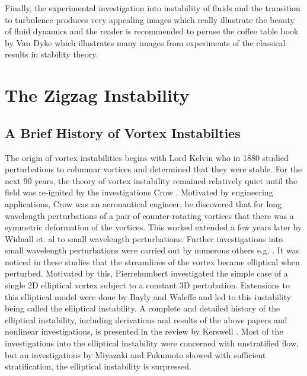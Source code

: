 Finally, the experimental investigation into instability of fluids and the transition to turbulence produces very appealing images which really illustrate the beauty of fluid dynamics and the reader is recommended to peruse the coffee table book by Van Dyke \cite{vandykealbum} which illustrates many images from experiments of the classical results in stability theory. 

\section{The Zigzag Instability}
\subsection{A Brief History of Vortex Instabilties}

The origin of vortex instabilities begins with Lord Kelvin who in 1880 studied perturbations to columnar vortices and determined that they were stable. For the next 90 years, the theory of vortex instability remained relatively quiet until the field was re-ignited by the investigations Crow \cite{crow1970}. Motivated by engineering applications, Crow was an aeronautical engineer, he discovered that for long wavelength perturbations of a pair of counter-rotating vortices that there was a symmetric deformation of the vortices. This worked extended a few years later by Widnall et. al \cite{widnall1974} to small wavelength perturbations. Further investigations into small wavelength perturbations were carried out by numerous others e.g. \cite{moore1975,tsai1976}. It was noticed in these studies that the streamlines of the vortex became elliptical when perturbed. Motivated by this, Pierrehumbert \cite{pierrehumbert1986} investigated the simple case of a single 2D elliptical vortex subject to a constant 3D pertubation. Extensions to this elliptical model were done by Bayly \cite{bayly1986} and Waleffe \cite{waleffe1990} and led to this instability being called the elliptical instability. A complete and detailed history of the elliptical instability, including derivations and results of the above papers and nonlinear investigations, is presented in the review by Kerswell \cite{kerswell2002}. Most of the investigations into the elliptical instability were concerned with unstratified flow, but an investigations by Miyazaki and Fukumoto \cite{miyazakifukumoto1992} showed with sufficient stratification, the elliptical instability is surpressed. 


